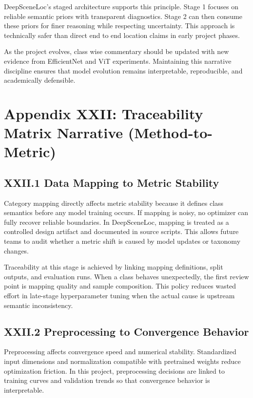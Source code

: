 DeepSceneLoc's staged architecture supports this principle. Stage 1 focuses on reliable semantic priors with transparent diagnostics. Stage 2 can then consume these priors for finer reasoning while respecting uncertainty. This approach is technically safer than direct end to end location claims in early project phases.

As the project evolves, class wise commentary should be updated with new evidence from EfficientNet and ViT experiments. Maintaining this narrative discipline ensures that model evolution remains interpretable, reproducible, and academically defensible.

\section*{Appendix XXII: Traceability Matrix Narrative (Method-to-Metric)}

\subsection*{XXII.1 Data Mapping to Metric Stability}
Category mapping directly affects metric stability because it defines class semantics before any model training occurs. If mapping is noisy, no optimizer can fully recover reliable boundaries. In DeepSceneLoc, mapping is treated as a controlled design artifact and documented in source scripts. This allows future teams to audit whether a metric shift is caused by model updates or taxonomy changes.

Traceability at this stage is achieved by linking mapping definitions, split outputs, and evaluation runs. When a class behaves unexpectedly, the first review point is mapping quality and sample composition. This policy reduces wasted effort in late-stage hyperparameter tuning when the actual cause is upstream semantic inconsistency.

\subsection*{XXII.2 Preprocessing to Convergence Behavior}
Preprocessing affects convergence speed and numerical stability. Standardized input dimensions and normalization compatible with pretrained weights reduce optimization friction. In this project, preprocessing decisions are linked to training curves and validation trends so that convergence behavior is interpretable.

